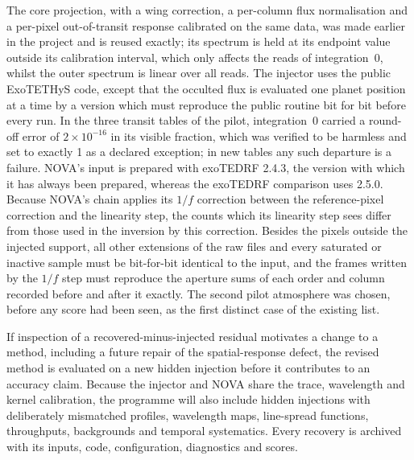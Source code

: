 The core projection, with a wing correction, a per-column flux
normalisation and a per-pixel out-of-transit response calibrated on the same
data, was made earlier in the project and is reused exactly; its spectrum is
held at its endpoint value outside its calibration interval, which only
affects the reads of integration~0, whilst the outer spectrum is linear over
all reads. The injector uses the public ExoTETHyS
code, except that the occulted flux is evaluated one planet position at a
time by a version which must reproduce the public routine bit for bit before
every run. In the three
transit tables of the pilot, integration~0 carried a round-off error of
$2\times10^{-16}$ in its visible fraction, which was verified to be harmless
and set to exactly 1 as a declared exception; in new tables any such
departure is a failure. NOVA's input is prepared with exoTEDRF 2.4.3, the version with which it has
always been prepared, whereas the exoTEDRF comparison uses 2.5.0. Because NOVA's
chain applies its $1/f$ correction between the reference-pixel correction and
the linearity step, the counts which its linearity step sees differ from those
used in the inversion by this correction. Besides the pixels outside the injected support, all
other extensions of the raw files and every saturated or inactive sample must
be bit-for-bit identical to the input, and the frames written by the $1/f$
step must reproduce the aperture sums of each order and column recorded
before and after it exactly. The second pilot
atmosphere was chosen, before any score had been seen, as the first distinct
case of the existing list.

If inspection of a recovered-minus-injected residual motivates a change to a
method, including a future repair of the spatial-response defect, the revised
method is evaluated on a new hidden injection before it contributes to an
accuracy claim. Because the injector and NOVA share the trace, wavelength and
kernel calibration, the programme will also include hidden injections with
deliberately mismatched profiles, wavelength maps, line-spread functions,
throughputs, backgrounds and temporal systematics. Every recovery is archived with
its inputs, code, configuration, diagnostics and scores.

